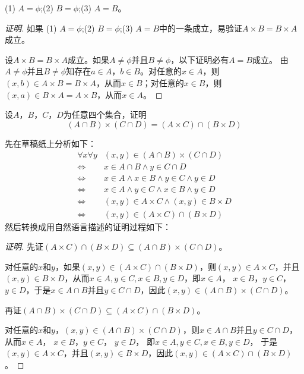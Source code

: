 \documentclass{article}
\begin{document}
\begin{CJK}{UTF8}{gbsn}
\begin{Exercise}
  (1) $A=\phi$;(2) $B=\phi$;(3) $A=B$。
\end{Exercise}
\begin{proof}[证明]
  如果 (1) $A=\phi$;(2) $B=\phi$;(3) $A=B$中的一条成立，易验证$A\times B= B\times A$成立。

  设$A\times B= B\times A$成立。如果$A\neq \phi$并且$B\neq \phi$，以下证明必有$A=B$成立。
  由$A\neq \phi$并且$B\neq \phi$知存在$a\in A$，$b\in B$。对任意的$x\in A$，则$(x,b)\in A\times B = B\times A$，从而$x\in B$；对任意的$x\in B$，则$(x,a)\in B\times A = A\times B$，从而$x\in A$。
\end{proof}
\begin{Exercise}
  设$A$，$B$，$C$，$D$为任意四个集合，证明
  \[(A\cap B) \times (C \cap D) = (A\times C)\cap (B \times D)\]
\end{Exercise}
先在草稿纸上分析如下：
\begin{equation*}
  \begin{split}
  \forall x \forall y&(x,y) \in (A\cap B) \times (C \cap D)\\
  \Leftrightarrow&x \in A \cap B \land y \in C \cap D\\
  \Leftrightarrow&x \in A \land x \in B \land y \in C \land y \in D\\
  \Leftrightarrow&x \in A \land y \in C \land x \in B \land y \in D\\
  \Leftrightarrow&(x,y) \in A \times C \land (x,y) \in B \times D\\
  \Leftrightarrow&(x,y) \in (A\times C)\cap (B \times D)
  \end{split}
\end{equation*}
然后转换成用自然语言描述的证明过程如下：
\begin{proof}[证明]
  先证$(A\times C)\cap (B \times D)\subseteq (A\cap B) \times (C \cap D)$。

  对任意的$x$和$y$，如果$(x,y)\in (A\times C)\cap (B \times D)$，则$(x,y)\in A\times C$，并且$(x,y)\in B \times D$，从而$x\in A,y\in C, x \in B, y\in D$，即$x\in A$， $x \in B$，$ y\in C$， $y\in D$，于是$x \in A\cap B$并且$y \in C \cap D$，因此$(x,y) \in (A\cap B) \times (C \cap D)$。
  
  再证$(A\cap B) \times (C \cap D) \subseteq (A\times C)\cap (B \times D)$。
  
    对任意的$x$和$y$，$(x,y) \in (A\cap B) \times (C \cap D)$，则$x\in A\cap B$并且$y \in C \cap D$，从而$x\in A$， $x \in B$，$ y\in C$， $y\in D$， 即$x\in A,y\in C, x \in B, y\in D$，
  于是$(x,y)\in A\times C$，并且$(x,y)\in B \times D$，因此$(x,y)\in (A\times C)\cap (B \times D)$。
  

\end{proof}
\end{CJK}
\end{document}
